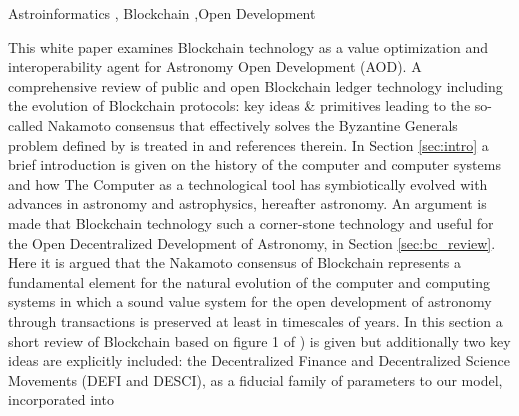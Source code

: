 \documentclass[final,5p,times,twocolumn,authoryear]{elsarticle}
\begin{document}
\begin{frontmatter}



\begin{keyword}
   Astroinformatics \sep 
Blockchain \sep Open Development
\end{keyword}
\end{frontmatter}

This white paper examines Blockchain technology as a value optimization and interoperability agent for Astronomy Open Development (AOD). A comprehensive review of public and open Blockchain ledger technology including the evolution of Blockchain protocols: key ideas \& primitives leading to the  so-called Nakamoto consensus that effectively solves the Byzantine Generals problem defined by \cite{Lamport1982TheBG} is treated in  \cite{arvindandclark2017} and references therein. In Section \ref{sec:intro} a brief introduction is given on the history of the computer and computer systems and how The Computer as a technological tool has symbiotically evolved with advances in astronomy and astrophysics, hereafter astronomy. An argument is made that Blockchain technology such a corner-stone technology and useful for the Open Decentralized Development of Astronomy, in Section \ref{sec:bc_review}. Here it is argued that the Nakamoto consensus of Blockchain represents a fundamental element for the natural evolution of the computer and computing systems in which a sound value system for the open development of astronomy through transactions is preserved at least in timescales of years. In this section a short review of Blockchain  based on figure 1 of \cite{arvindandclark2017}) is given but additionally two key ideas are explicitly included: the Decentralized Finance and Decentralized Science Movements (DEFI and DESCI), as a fiducial family of parameters to our model, incorporated into 
\end{document}
